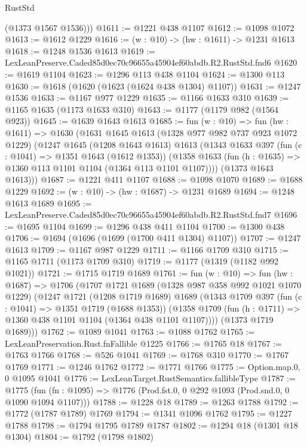 \begin{lexlean}{RustStd}
\begin{coremodule}
        (@1373 @1567 @1536)))
@1611 := @1221 @438 @1107
@1612 := @1098 @1072
@1613 := @1612 @1229
@1616 := (w : @10) -> (hw : @1611) -> @1231 @1613
@1618 := @1248 @1536 @1613
@1619 := LexLeanPreserve.Caded85d0ec70c96655a45904ef60abdb.R2.RustStd.fnd6
@1620 := @1619 @1104
@1623 := @1296 @113 @438 @1104
@1624 := @1300 @113
@1630 := @1618 (@1620 (@1623 (@1624 @438 @1304) @1107))
@1631 := @1247 @1536
@1633 := @1167 @977 @1229
@1635 := @1166 @1633 @310
@1639 := @1165 @1635 (@1173 @1633 @310)
@1643 := @1177 (@1179 @982 (@1564 @923))
@1645 := @1639 @1643 @1613
@1685 := fun (w : @10) =>
  fun (hw : @1611) =>
  @1630
    (@1631
      @1645
      @1613
      (@1328 @977 @982 @737 @923 @1072 @1229)
      (@1247
        @1645
        (@1208 @1643 @1613)
        @1613
        (@1343
          @1633
          @397
          (fun (c : @1041) => @1351 @1643 (@1612 @1353))
          (@1358 @1633 (fun (h : @1635) => @1360 @113 @1101 @1104 (@1364 @113 @1101 @1107))))
        (@1373 @1643 @1613)))
@1687 := @1221 @411 @1107
@1688 := @1098 @1070
@1689 := @1688 @1229
@1692 := (w : @10) -> (hw : @1687) -> @1231 @1689
@1694 := @1248 @1613 @1689
@1695 := LexLeanPreserve.Caded85d0ec70c96655a45904ef60abdb.R2.RustStd.fnd7
@1696 := @1695 @1104
@1699 := @1296 @438 @411 @1104
@1700 := @1300 @438
@1706 := @1694 (@1696 (@1699 (@1700 @411 @1304) @1107))
@1707 := @1247 @1613
@1709 := @1167 @987 @1229
@1711 := @1166 @1709 @310
@1715 := @1165 @1711 (@1173 @1709 @310)
@1719 := @1177 (@1319 (@1182 @992 @1021))
@1721 := @1715 @1719 @1689
@1761 := fun (w : @10) =>
  fun (hw : @1687) =>
  @1706
    (@1707
      @1721
      @1689
      (@1328 @987 @358 @992 @1021 @1070 @1229)
      (@1247
        @1721
        (@1208 @1719 @1689)
        @1689
        (@1343
          @1709
          @397
          (fun (c : @1041) => @1351 @1719 (@1688 @1353))
          (@1358 @1709 (fun (h : @1711) => @1360 @438 @1101 @1104 (@1364 @438 @1101 @1107))))
        (@1373 @1719 @1689)))
@1762 := @1089 @1041
@1763 := @1088 @1762
@1765 := LexLeanPreservation.Rust.fnFallible @1225
@1766 := @1765 @18
@1767 := @1763 @1766
@1768 := @526 @1041
@1769 := @1768 @310
@1770 := @1767 @1769
@1771 := @1246 @1762
@1772 := @1771 @1766
@1775 := Option.map.{0, 0} @1095 @1041
@1776 := LexLeanTarget.RustSemantics.fallibleType
@1787 := @1775
    (fun (fn : @1095) => @1776 (Prod.fst.{0, 0} @292 @1093 (Prod.snd.{0, 0} @1090 @1094 @1107)))
@1788 := @1228 @18
@1789 := @1263 @1788
@1792 := @1772 (@1787 @1789) @1769
@1794 := @1341 @1096 @1762
@1795 := @1227 @1788
@1798 := @1794 @1795 @1789 @1787
@1802 := @1294 @18 (@1301 @18 @1304)
@1804 := @1792 (@1798 @1802)

\end{coremodule}
\end{lexlean}
